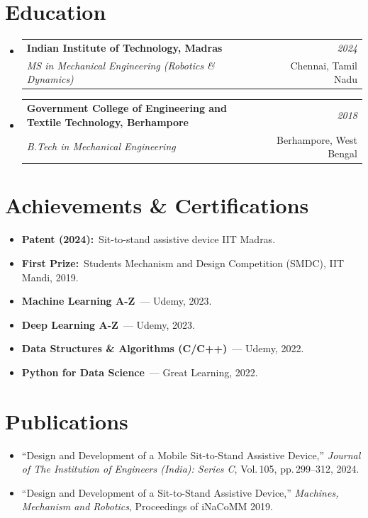 \documentclass[a4paper,10pt]{article}
\makeatletter
\newcommand{\resumeSubheading}[4]{
  \vspace{-2pt}\item[]
  \begin{tabular*}{\textwidth}[t]{l@{\extracolsep{\fill}}r}
    {\color{DarkNavy}\textbf{\normalsize #1}} & {\color{SlateGray}\small\textit{#2}} \\
    {\color{MidBlue}\textit{\small #3}} & {\color{SlateGray}\small #4} \\
  \end{tabular*}\vspace{-4pt}
}
\newcommand{\resumeItem}[1]{
  \item\small{#1\vspace{-2pt}}
}
\newcommand{\resumeLabelItem}[2]{
  \item\small{{\color{MidBlue}\textbf{#1}}\ #2\vspace{-2pt}}
}
\newcommand{\resumeSubHeadingListStart}{\begin{itemize}[leftmargin=0in, label={}]}
\newcommand{\resumeSubHeadingListEnd}{\end{itemize}}
\newcommand{\resumeItemListStart}{\begin{itemize}[leftmargin=0.18in, itemsep=0.5pt, topsep=2pt]}
\newcommand{\resumeItemListEnd}{\end{itemize}\vspace{-3pt}}
\makeatother
\begin{document}
\vspace{-2pt}

\section{Education}

\resumeSubHeadingListStart
  \resumeSubheading
    {Indian Institute of Technology, Madras}{2024}
    {MS in Mechanical Engineering (Robotics \& Dynamics)}{Chennai, Tamil Nadu}
  \resumeSubheading
    {Government College of Engineering and Textile Technology, Berhampore}{2018}
    {B.Tech in Mechanical Engineering}{Berhampore, West Bengal}
\resumeSubHeadingListEnd

\vspace{-2pt}

\section{Achievements \& Certifications}

\resumeItemListStart
  \resumeLabelItem{Patent (2024):}{Sit-to-stand assistive device \textemdash{} IIT Madras.}
  \resumeLabelItem{First Prize:}{Students Mechanism and Design Competition (SMDC), IIT Mandi, 2019.}
  \resumeLabelItem{Machine Learning A-Z}{--- Udemy, 2023.}
  \resumeLabelItem{Deep Learning A-Z}{--- Udemy, 2023.}
  \resumeLabelItem{Data Structures \& Algorithms (C/C++)}{--- Udemy, 2022.}
  \resumeLabelItem{Python for Data Science}{--- Great Learning, 2022.}
\resumeItemListEnd

\vspace{-2pt}

\section{Publications}

\resumeItemListStart
  \resumeItem{``Design and Development of a Mobile Sit-to-Stand Assistive Device,'' \textit{Journal of The Institution of Engineers (India): Series C}, Vol.\,105, pp.\,299--312, 2024.}
  \resumeItem{``Design and Development of a Sit-to-Stand Assistive Device,'' \textit{Machines, Mechanism and Robotics}, Proceedings of iNaCoMM 2019.}
\resumeItemListEnd
\end{document}
